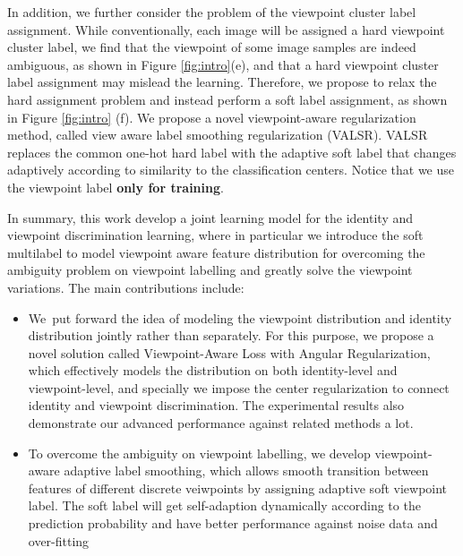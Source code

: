 \documentclass[letterpaper]{article} \usepackage{aaai20}  \usepackage{times}  \usepackage{helvet} \usepackage{courier}  \usepackage[hyphens]{url}  \usepackage{graphicx} \usepackage{array}
\begin{document}
In addition, we further consider the problem of the viewpoint cluster label assignment. While conventionally, each image will be assigned a hard viewpoint cluster label, we find that the viewpoint of some image samples are indeed ambiguous, as shown in Figure \ref{fig:intro}(e), and that a hard viewpoint cluster label assignment may mislead the learning. Therefore, we propose to relax the hard assignment problem and instead perform a soft label assignment, as shown in Figure \ref{fig:intro} (f). We propose a novel viewpoint-aware regularization method, called view aware label smoothing regularization (VALSR). VALSR replaces the common one-hot hard label with the adaptive soft label that changes adaptively according to similarity to the classification centers. Notice that we use the viewpoint label \textbf{only for training}.


In summary, this work develop a joint learning model for the identity and viewpoint discrimination learning, where in particular we introduce the soft multilabel to model viewpoint aware feature distribution for overcoming the ambiguity problem on viewpoint labelling and greatly solve the viewpoint variations. The main contributions include:
\begin{itemize}
    \item We put forward the idea of modeling the viewpoint distribution and identity distribution jointly rather than separately. For this purpose, we propose a novel solution called Viewpoint-Aware Loss with Angular Regularization, which effectively models the distribution on both identity-level and viewpoint-level, and specially we impose the center regularization to connect identity and viewpoint discrimination. The experimental results also demonstrate our advanced performance against related methods a lot.
    \item To overcome the ambiguity on viewpoint labelling, we develop viewpoint-aware adaptive label smoothing, which allows smooth transition between features of different discrete veiwpoints by assigning adaptive soft viewpoint label. The soft label will get self-adaption dynamically according to the prediction probability and have better performance against noise data and over-fitting
\end{itemize}
\end{document}
